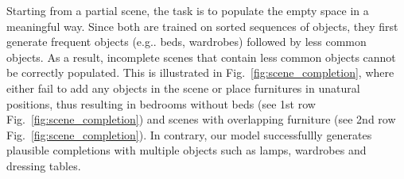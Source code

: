 \documentclass{article}
\makeatletter
\DeclareRobustCommand\onedot{\futurelet\@let@token\@onedot}
\def\@onedot{\ifx\@let@token.\else.\null\fi\xspace}
\def\eg{e.g\onedot} \def\Eg{E.g\onedot}
\newcommand{\boldparagraph}[1]{\vspace{0.2cm}\noindent{\bf #1:} }
\newcommand{\figref}[1]{Fig.~\ref{#1}}
\makeatother
\begin{document}
\boldparagraph{Scene Completion}Starting from a partial scene, the task is to populate the empty space in a
meaningful way. Since both \cite{Ritchie2019CVPR, Wang2020ARXIV} are trained on
sorted sequences of objects, they first generate frequent objects (\eg beds,
wardrobes) followed by less common objects. As a result, incomplete scenes that
contain less common objects cannot be correctly populated.  This is illustrated
in \figref{fig:scene_completion}, where \cite{Ritchie2019CVPR, Wang2020ARXIV}
either fail to add any objects in the scene or place furnitures in unatural
positions, thus resulting in bedrooms without beds (see 1st row
\figref{fig:scene_completion}) and scenes with overlapping furniture (see 2nd
row \figref{fig:scene_completion}). In contrary, our model successfullly
generates plausible completions with multiple objects such as lamps, wardrobes
and dressing tables.
\end{document}
